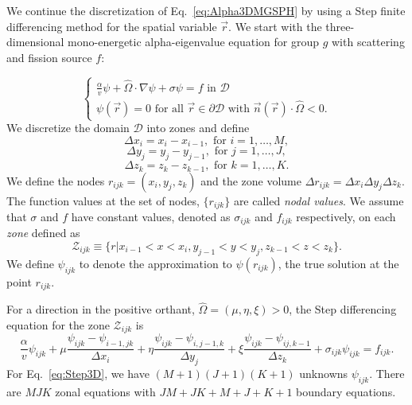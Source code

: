 We continue the discretization of Eq.~\ref{eq:Alpha3DMGSPH} by using a Step finite differencing method \cite{lewis_computational_1984} for the spatial variable $\vec{r}$. We start with the three-dimensional mono-energetic alpha-eigenvalue equation for group $g$ with scattering and fission source $f$:

\begin{equation}
\begin{cases}
	\frac{\alpha}{v} \psi + \hat{\Omega} \cdot \nabla \psi + \sigma \psi = f \text{ in } \mathcal{D} \\
	\psi(\vec{r}) = 0 \text{ for all } \vec{r} \in \partial \mathcal{D} \text { with } \vec{n}(\vec{r}) \cdot \hat{\Omega} < 0.
\end{cases}
\label{eq:ContG}
\end{equation}
We discretize the domain $\mathcal{D}$ into zones and define
\begin{equation}
	\Delta x_{i} = x_{i} - x_{i-1}, \text{ for } i = 1, \dots, M,
\end{equation}
\begin{equation}
	\Delta y_{j} = y_{j} - y_{j-1}, \text{ for } j = 1, \dots, J,
\end{equation}
\begin{equation}
	\Delta z_{k} = z_{k} - z_{k-1}, \text{ for } k = 1, \dots, K.
\end{equation}
We define the nodes $r_{ijk} = (x_{i}, y_{j}, z_{k})$ and the zone volume $\Delta r_{ijk} = \Delta x_{i} \Delta y_{j} \Delta z_{k}$. The function values at the set of nodes, $\{r_{ijk}\}$ are called \textit{nodal values}. We assume that $\sigma$ and $f$ have constant values, denoted as $\sigma_{ijk}$ and $f_{ijk}$ respectively, on each \textit{zone} defined as
\begin{equation}
	\mathcal{Z}_{ijk} \equiv \{ r \vert x_{i-1} < x < x_{i}, y_{j-1} < y < y_{j}, z_{k-1} < z < z_{k} \}.
\end{equation}
We define $\psi_{ijk}$ to denote the approximation to $\psi(r_{ijk})$, the true solution at the point $r_{ijk}$. 

For a direction in the positive orthant, $\hat{\Omega} = (\mu, \eta, \xi) > 0$, the Step differencing equation for the zone $\mathcal{Z}_{ijk}$ is
\begin{equation}
	\frac{\alpha}{v} \psi_{ijk} + \mu \frac{\psi_{ijk} - \psi_{i-1,jk}}{\Delta x_{i}} + \eta \frac{\psi_{ijk} - \psi_{i,j-1,k}}{\Delta y_{j}} + \xi \frac{\psi_{ijk} - \psi_{ij,k-1}}{\Delta z_{k}} + \sigma_{ijk} \psi_{ijk} = f_{ijk}.
	\label{eq:Step3D}
\end{equation}
For Eq.~\ref{eq:Step3D}, we have $(M+1)(J+1)(K+1)$ unknowns $\psi_{ijk}$. There are $MJK$ zonal equations with $JM + JK + M + J + K + 1$ boundary equations.

